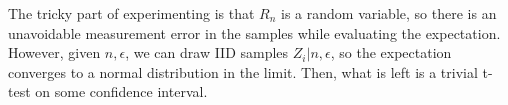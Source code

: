 \documentclass[11pt, letterpaper]{article}
\begin{document}
The tricky part of experimenting is that $R_n$ is a random variable, so there is an unavoidable measurement error in the samples while evaluating the expectation. However, given $n, \epsilon$, we can draw IID samples $Z_i|n, \epsilon$, so the expectation converges to a normal distribution in the limit. Then, what is left is a trivial t-test on some confidence interval.
\end{document}
